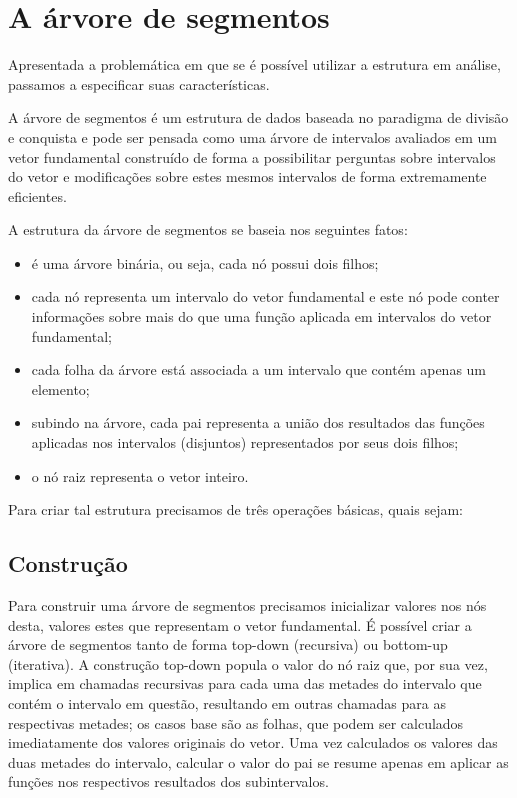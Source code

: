 \chapter{A árvore de segmentos}
\label{cap:implementacao-i}

Apresentada a problemática em que se é possível utilizar a estrutura em análise, 
passamos a especificar suas características.

A árvore de segmentos é um estrutura de dados baseada no paradigma de divisão e 
conquista e pode ser pensada como uma árvore de intervalos avaliados em um vetor 
fundamental construído de forma a possibilitar perguntas sobre intervalos do 
vetor e modificações sobre estes mesmos intervalos de forma extremamente 
eficientes.

A estrutura da árvore de segmentos se baseia nos seguintes fatos:
\begin{itemize}
    \item é uma árvore binária, ou seja, cada nó possui dois filhos;
    \item cada nó representa um intervalo do vetor fundamental e este nó pode 
    conter informações sobre mais do que uma função aplicada em intervalos do 
    vetor fundamental;
    \item cada folha da árvore está associada a um intervalo que contém apenas 
    um elemento;
    \item subindo na árvore, cada pai representa a união dos resultados das 
    funções aplicadas nos intervalos (disjuntos) representados por seus dois 
    filhos;
    \item o nó raiz representa o vetor inteiro.
\end{itemize}

Para criar tal estrutura precisamos de três operações básicas, quais sejam:

\section{Construção}

Para construir uma árvore de segmentos precisamos inicializar valores nos nós 
desta, valores estes que representam o vetor fundamental. É possível criar a 
árvore de segmentos tanto de forma top-down (recursiva) ou bottom-up 
(iterativa). A construção top-down popula o valor do nó raiz que, por sua vez, 
implica em chamadas recursivas para cada uma das metades do intervalo que contém 
o intervalo em questão, resultando em outras chamadas para as respectivas metades; 
os casos base são as folhas, que podem ser calculados imediatamente dos valores 
originais do vetor. Uma vez calculados os valores das duas metades do intervalo, 
calcular o valor do pai se resume apenas em aplicar as funções nos respectivos 
resultados dos subintervalos.

